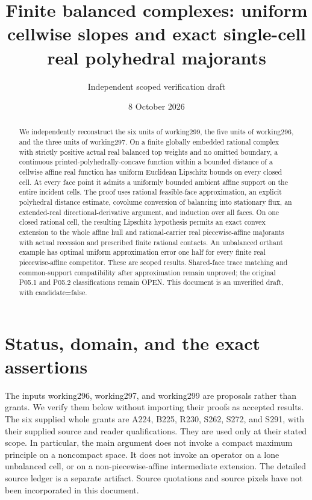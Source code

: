 \documentclass[
  11pt,
]{article}
\title{Finite balanced complexes: uniform cellwise slopes and exact
single-cell real polyhedral majorants}
\author{Independent scoped verification draft}
\date{8 October 2026}
\begin{document}
\maketitle
\begin{abstract}
We independently reconstruct the six units of working299, the five units
of working296, and the three units of working297. On a finite globally
embedded rational complex with strictly positive actual real balanced
top weights and no omitted boundary, a continuous
printed-polyhedrally-concave function within a bounded distance of a
cellwise affine real function has uniform Euclidean Lipschitz bounds on
every closed cell. At every face point it admits a uniformly bounded
ambient affine support on the entire incident cells. The proof uses
rational feasible-face approximation, an explicit polyhedral distance
estimate, covolume conversion of balancing into stationary flux, an
extended-real directional-derivative argument, and induction over all
faces. On one closed rational cell, the resulting Lipschitz hypothesis
permits an exact convex extension to the whole affine hull and
rational-carrier real piecewise-affine majorants with actual recession
and prescribed finite rational contacts. An unbalanced orthant example
has optimal uniform approximation error one half for every finite real
piecewise-affine competitor. These are scoped results. Shared-face trace
matching and common-support compatibility after approximation remain
unproved; the original P05.1 and P05.2 classifications remain OPEN. This
document is an unverified draft, with candidate=false.
\end{abstract}

{
\hypersetup{linkcolor=}
\setcounter{tocdepth}{3}
\tableofcontents
}
\section{Status, domain, and the exact
assertions}\label{status-domain-and-the-exact-assertions}

The inputs working296, working297, and working299 are proposals rather
than grants. We verify them below without importing their proofs as
accepted results. The six supplied whole grants are A224, B225, R230,
S262, S272, and S291, with their supplied source and reader
qualifications. They are used only at their stated scope. In particular,
the main argument does not invoke a compact maximum principle on a
noncompact space. It does not invoke an operator on a lone unbalanced
cell, or on a non-piecewise-affine intermediate extension. The detailed
source ledger is a separate artifact. Source quotations and source
pixels have not been incorporated in this document.
\end{document}
